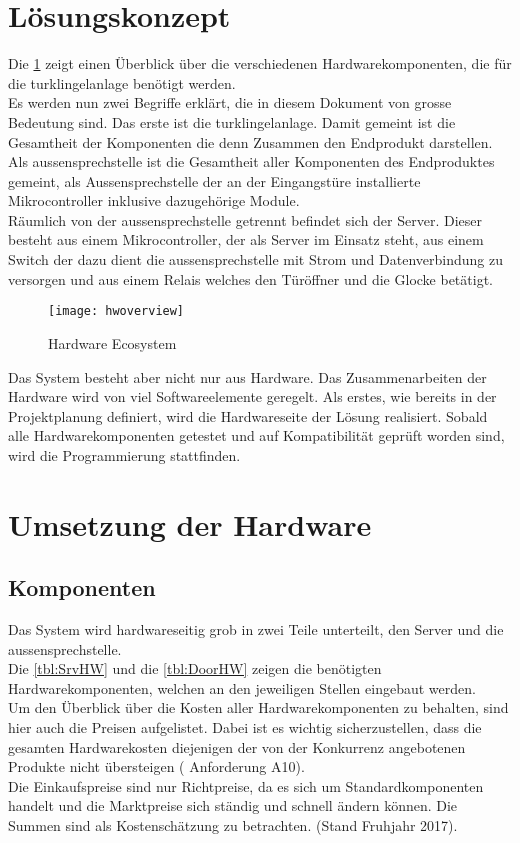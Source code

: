 \section{Lösungskonzept}
\label{sec:lösungskonzept}
Die \cref{fig:hwoverview} zeigt einen Überblick über die verschiedenen Hardwarekomponenten, die für die \gls{turklingelanlage} benötigt werden.
\\
Es werden nun zwei Begriffe erklärt, die in diesem Dokument von grosse Bedeutung sind. Das erste ist die \gls{turklingelanlage}. Damit gemeint ist die Gesamtheit der Komponenten die denn Zusammen den Endprodukt darstellen.
\\
Als \gls{aussensprechstelle} ist die Gesamtheit aller Komponenten des Endproduktes gemeint, als Aussensprechstelle der an der Eingangstüre installierte Mikrocontroller inklusive dazugehörige Module.
\\
Räumlich von der \gls{aussensprechstelle} getrennt befindet sich der Server. Dieser besteht aus einem Mikrocontroller, der als Server im Einsatz steht, aus einem Switch der dazu dient die \gls{aussensprechstelle} mit Strom und Datenverbindung zu versorgen und aus einem Relais welches den Türöffner und die Glocke betätigt.
\begin{figure}[htb!]
	\begin{center}
		\texttt{[image: hwoverview]}
		\caption[Hardware Ecosystem]{Hardware Ecosystem}
		\label{fig:hwoverview}
	\end{center}
\end{figure}
Das System besteht aber nicht nur aus Hardware. Das Zusammenarbeiten der Hardware wird von viel Softwareelemente geregelt. Als erstes, wie bereits in der Projektplanung definiert, wird die Hardwareseite der Lösung realisiert. Sobald alle Hardwarekomponenten getestet und auf Kompatibilität geprüft worden sind, wird die Programmierung stattfinden.
\newpage

\section{Umsetzung der Hardware}
\label{sec:chapterexample}
\subsection{Komponenten}
Das System wird hardwareseitig grob in zwei Teile unterteilt, den Server und die \gls{aussensprechstelle}.
\\
Die \cref{tbl:SrvHW} und die \cref{tbl:DoorHW} zeigen die benötigten Hardwarekomponenten, welchen an den jeweiligen Stellen eingebaut werden.
\\
Um den Überblick über die Kosten aller Hardwarekomponenten zu behalten, sind hier auch die Preisen aufgelistet. Dabei ist es wichtig sicherzustellen, dass die gesamten Hardwarekosten diejenigen der von der Konkurrenz angebotenen Produkte nicht übersteigen ( Anforderung A10).
\\
Die Einkaufspreise sind nur Richtpreise, da es sich um Standardkomponenten handelt und die Marktpreise sich ständig und schnell ändern können. Die Summen sind als Kostenschätzung zu betrachten. (Stand Fruhjahr 2017).

